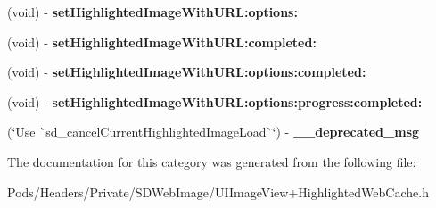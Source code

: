 \begin{DoxyCompactItemize}
\item 
\mbox{\label{category_u_i_image_view_07_highlighted_web_cache_deprecated_08_a2bd061c465ca398dd62daae24ebc86fc}} 
(void) -\/ {\bfseries set\+Highlighted\+Image\+With\+U\+R\+L\+:options\+:}
\item 
\mbox{\label{category_u_i_image_view_07_highlighted_web_cache_deprecated_08_a75c246067498b4528688fdc61d6989bd}} 
(void) -\/ {\bfseries set\+Highlighted\+Image\+With\+U\+R\+L\+:completed\+:}
\item 
\mbox{\label{category_u_i_image_view_07_highlighted_web_cache_deprecated_08_a501b2bd3725b08ca2dbb5b0c24ce15e4}} 
(void) -\/ {\bfseries set\+Highlighted\+Image\+With\+U\+R\+L\+:options\+:completed\+:}
\item 
\mbox{\label{category_u_i_image_view_07_highlighted_web_cache_deprecated_08_ab41175b78f491f6e13f912443618357c}} 
(void) -\/ {\bfseries set\+Highlighted\+Image\+With\+U\+R\+L\+:options\+:progress\+:completed\+:}
\item 
\mbox{\label{category_u_i_image_view_07_highlighted_web_cache_deprecated_08_afb53abd0302272b5f57ad21a8a5b8444}} 
(\char`\"{}Use \`{}sd\+\_\+cancel\+Current\+Highlighted\+Image\+Load\`{}\char`\"{}) -\/ {\bfseries \+\_\+\+\_\+deprecated\+\_\+msg}
\end{DoxyCompactItemize}


The documentation for this category was generated from the following file\+:\begin{DoxyCompactItemize}
\item 
Pods/\+Headers/\+Private/\+S\+D\+Web\+Image/U\+I\+Image\+View+\+Highlighted\+Web\+Cache.\+h\end{DoxyCompactItemize}
